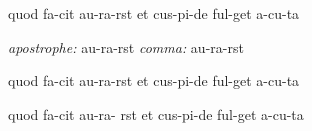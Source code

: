 \documentclass[english]{article}
\begin{document}
        {quod fa-cit au-ra-{rst} et cus-pi-de  ful-get  a-cu-ta}
        
\bigskip
\emph{apostrophe:}
        {au-ra-{rst}} \qquad
\emph{comma:}
\metrics{_  _  ,   _          }
        {au-ra-{rst}}




\bigskip
{}
        {quod fa-cit au-ra-{rst} et cus-pi-de  ful-get  a-cu-ta}

\bigskip
\newcommand{\fakesep}{
\raisebox{.83em}{{\rule{.04em}{6.47pt}}}\hspace{-3.6pt}
}
        {quod fa-cit au-ra-\fakesep{rst} et cus-pi-de  ful-get  a-cu-ta}

\bigskip
{}


\vspace{25mm}


\end{document}
